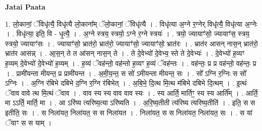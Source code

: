\documentclass[17pt]{extarticle}
\begin{document}
\textbf{Jatai Paata} \newline

1. लो॒कानां॒ ॅविधृ॑त्यै॒ विधृ॑त्यै लो॒काना᳚म् ॅलो॒कानां॒ ॅविधृ॑त्यै । . विधृ॑त्या अ॒ग्ने र॒ग्नेर् विधृ॑त्यै॒ विधृ॑त्या अ॒ग्नेः । . विधृ॑त्या॒ इति॒ वि - धृ॒त्यै॒ । . अ॒ग्ने स्त्रय॒ स्त्रयो॒ ऽग्ने र॒ग्ने स्त्रयः॑ । . त्रयो॒ ज्यायाꣳ॑सो॒ ज्यायाꣳ॑स॒ स्त्रय॒ स्त्रयो॒ ज्यायाꣳ॑सः । . ज्यायाꣳ॑सो॒ भ्रात॑रो॒ भ्रात॑रो॒ ज्यायाꣳ॑सो॒ ज्यायाꣳ॑सो॒ भ्रात॑रः । . भ्रात॑र आसन् नास॒न् भ्रात॑रो॒ भ्रात॑र आसन्न् । . आ॒स॒न् ते त आ॑सन् नास॒न् ते । . ते दे॒वेभ्यो॑ दे॒वेभ्य॒ स्ते ते दे॒वेभ्यः॑ । . दे॒वेभ्यो॑ ह॒व्यꣳ ह॒व्यम् दे॒वेभ्यो॑ दे॒वेभ्यो॑ ह॒व्यम् । . ह॒व्यं ॅवह॑न्तो॒ वह॑न्तो ह॒व्यꣳ ह॒व्यं ॅवह॑न्तः । . वह॑न्तः॒ प्र प्र वह॑न्तो॒ वह॑न्तः॒ प्र । . प्रामी॑यन्ता मीयन्त॒ प्र प्रामी॑यन्त । . अ॒मी॒य॒न्त॒ स सो॑ ऽमीयन्ता मीयन्त॒ सः । . सो᳚ ऽग्नि र॒ग्निः स सो᳚ ऽग्निः । . अ॒ग्नि र॑बिभे दबिभे द॒ग्नि र॒ग्नि र॑बिभेत् । . अ॒बि॒भे॒ दि॒त्थ मि॒त्थ म॑बिभे दबिभे दि॒त्थम् । . इ॒त्थं ॅवाव वावे त्थ मि॒त्थं ॅवाव । . वाव स्य स्य वाव वाव स्यः । . स्य आर्ति॒ मार्तिꣳ॒॒ स्य स्य आर्ति᳚म् । . आर्ति॒ मा ऽऽर्ति॒ मार्ति॒ मा । . आ ऽरि॑ष्य त्यरिष्य॒त्या ऽरि॑ष्यति । . अ॒रि॒ष्य॒तीती त्य॑रिष्य त्यरिष्य॒तीति॑ । . इति॒ स स इतीति॒ सः । . स निला॑यत॒ निला॑यत॒ स स निला॑यत । . निला॑यत॒ स स निला॑यत॒ निला॑यत॒ सः । . स यां ॅयाꣳ स स याम् । \newline
\end{document}
